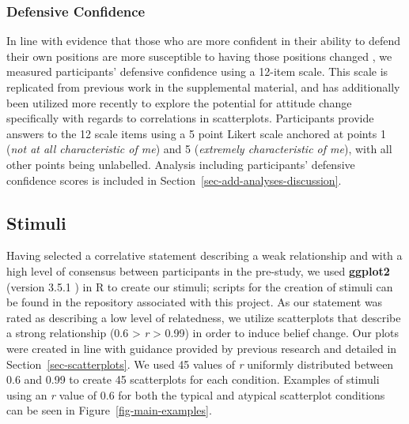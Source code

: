 \documentclass[manuscript,screen,review,anonymous]{acmart}
\begin{document}
\subsubsection{Defensive Confidence}\label{sec-def-con}

In line with evidence that those who are more confident in their ability
to defend their own positions are more susceptible to having those
positions changed \citep{albarracin_2004}, we measured participants'
defensive confidence using a 12-item scale. This scale is replicated
from previous work in the supplemental material, and has additionally
been utilized more recently \citep{markant_2023} to explore the
potential for attitude change specifically with regards to correlations
in scatterplots. Participants provide answers to the 12 scale items
using a 5 point Likert scale anchored at points 1 (\emph{not at all
characteristic of me}) and 5 (\emph{extremely characteristic of me}),
with all other points being unlabelled. Analysis including participants'
defensive confidence scores is included in
Section~\ref{sec-add-analyses-discussion}.

\subsection{Stimuli}\label{sec-stimuli-main}

Having selected a correlative statement describing a weak relationship
and with a high level of consensus between participants in the
pre-study, we used \textbf{ggplot2} (version 3.5.1 \citep{ggplot}) in R
to create our stimuli; scripts for the creation of stimuli can be found
in the repository associated with this project. As our statement was
rated as describing a low level of relatedness, we utilize scatterplots
that describe a strong relationship (0.6 \textgreater{} \emph{r}
\textgreater{} 0.99) in order to induce belief change. Our plots were
created in line with guidance provided by previous research and detailed
in Section~\ref{sec-scatterplots}. We used 45 values of \emph{r}
uniformly distributed between 0.6 and 0.99 to create 45 scatterplots for
each condition. Examples of stimuli using an \emph{r} value of 0.6 for
both the typical and atypical scatterplot conditions can be seen in
Figure~\ref{fig-main-examples}.
\end{document}

